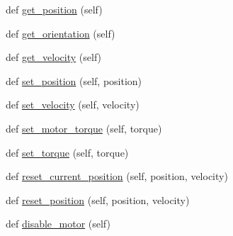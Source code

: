 \begin{DoxyCompactItemize}
\item 
def \hyperlink{classpybullet-gym_1_1pybulletgym_1_1envs_1_1roboschool_1_1robots_1_1robot__bases_1_1_joint_a2d6788f6f2f09d109f8ecb5a829aa34e}{get\+\_\+position} (self)
\item 
def \hyperlink{classpybullet-gym_1_1pybulletgym_1_1envs_1_1roboschool_1_1robots_1_1robot__bases_1_1_joint_a36ff1e29867c3ebdecff242819a38525}{get\+\_\+orientation} (self)
\item 
def \hyperlink{classpybullet-gym_1_1pybulletgym_1_1envs_1_1roboschool_1_1robots_1_1robot__bases_1_1_joint_ad9691d0319b8eacbb60531efd0d2f7f9}{get\+\_\+velocity} (self)
\item 
def \hyperlink{classpybullet-gym_1_1pybulletgym_1_1envs_1_1roboschool_1_1robots_1_1robot__bases_1_1_joint_a6703e4899e0080613e7d10cac44a5912}{set\+\_\+position} (self, position)
\item 
def \hyperlink{classpybullet-gym_1_1pybulletgym_1_1envs_1_1roboschool_1_1robots_1_1robot__bases_1_1_joint_ab9340f4e96cd59fec5ff80d91c76c795}{set\+\_\+velocity} (self, velocity)
\item 
def \hyperlink{classpybullet-gym_1_1pybulletgym_1_1envs_1_1roboschool_1_1robots_1_1robot__bases_1_1_joint_ab13763034bfa2b480168725bc14acee0}{set\+\_\+motor\+\_\+torque} (self, torque)
\item 
def \hyperlink{classpybullet-gym_1_1pybulletgym_1_1envs_1_1roboschool_1_1robots_1_1robot__bases_1_1_joint_a8411d69a3fdcb75c21734a2ed2cf4a93}{set\+\_\+torque} (self, torque)
\item 
def \hyperlink{classpybullet-gym_1_1pybulletgym_1_1envs_1_1roboschool_1_1robots_1_1robot__bases_1_1_joint_ae098841870efb34cdb287ffdad799846}{reset\+\_\+current\+\_\+position} (self, position, velocity)
\item 
def \hyperlink{classpybullet-gym_1_1pybulletgym_1_1envs_1_1roboschool_1_1robots_1_1robot__bases_1_1_joint_a697b6fac7ba8480da8332a4b4f4ffa1d}{reset\+\_\+position} (self, position, velocity)
\item 
def \hyperlink{classpybullet-gym_1_1pybulletgym_1_1envs_1_1roboschool_1_1robots_1_1robot__bases_1_1_joint_af6988cc037a2e89a2a4a02344afd4af0}{disable\+\_\+motor} (self)
\end{DoxyCompactItemize}
